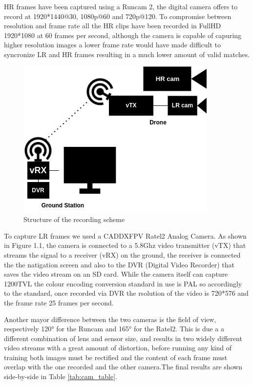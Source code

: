 HR frames have been captured using a Runcam 2\cite{runcam}, the digital camera offers to record at 1920*1440@30, 1080p@60 and 720p@120. To compromise between resolution and frame rate all the HR clips have been recorded in FullHD 1920*1080 at 60 frames per second, although the camera is capable of capuring higher resolution images a lower frame rate would have made difficult to syncronize LR and HR frames resulting in a much lower amount of valid matches.
\begin{figure}[h]
  \centering
  \includegraphics[scale=0.5]{figures/recording_schematics_2.png}
  \caption{Structure of the recording scheme}
\end{figure}
To capture LR frames we used a CADDXFPV Ratel2 Analog Camera\cite{caddx}. As shown in Figure 1.1, the camera is connected to a 5.8Ghz video transmitter (vTX) that streams the signal to a receiver (vRX) on the ground, the receiver is connected the the natigation screen and also to the DVR (Digital Video Recorder) that saves the video stream on an SD card. While the camera itself can capture 1200TVL the colour encoding conversion standard in use is PAL\cite{pal} so accordingly to the standard, once recorded via DVR the rsolution of the video is 720*576 and the frame rate 25 frames per second.

Another mayor difference between the two cameras is the field of view, respectively 120° for the Runcam and 165° for the Ratel2. This is due a a different combination of lens and sensor size, and results in two widely different video streams with a great amount of distortion, before running any kind of training both images must be rectified and the content of each frame must overlap with the one recorded and the other camera.The final results are shown side-by-side in Table \ref{tab:cam_table}.




